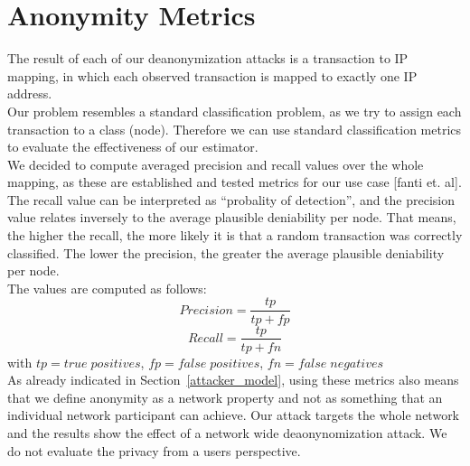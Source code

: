 \section{Anonymity Metrics\label{metrics}}
The result of each of our deanonymization attacks is a transaction to IP mapping,
in which each observed transaction is mapped to exactly one IP address. \\
Our problem resembles a standard classification problem, as we try to assign each
transaction to a class (node). Therefore we can use standard classification metrics to
evaluate the effectiveness of our estimator. \\
We decided to compute averaged precision and recall values over the whole mapping,
as these are established and tested metrics for our use case [fanti et. al]. \\
The recall value can be interpreted as ``probality of detection'', and the
precision value relates inversely to the average plausible deniability per node.
That means, the higher the recall, the more likely it is that a random transaction
was correctly classified. The lower the precision, the greater the average plausible
deniability per node. \\
The values are computed as follows: 
$$Precision = \frac{tp}{tp + fp}$$
$$Recall = \frac{tp}{tp + fn}$$
with
$tp = true\;positives$, $fp = false\;positives$, $fn = false\;negatives$
\\
As already indicated in Section~\ref{attacker_model}, using these metrics also means that we define anonymity as a network
property and not as something that an individual network participant can achieve.
Our attack targets the whole network and the results show the effect of a network
wide deaonynomization attack. We do not evaluate the privacy from a users
perspective.
